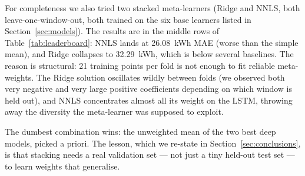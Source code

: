 For completeness we also tried two stacked meta-learners (Ridge and
NNLS, both leave-one-window-out, both trained on the six base learners
listed in Section~\ref{sec:models}). The results are in the middle
rows of Table~\ref{tab:leaderboard}: NNLS lands at 26.08~kWh MAE
(worse than the simple mean), and Ridge collapses to 32.29~kWh, which
is below several baselines. The reason is structural: 21 training
points per fold is not enough to fit reliable meta-weights. The Ridge
solution oscillates wildly between folds (we observed both very
negative and very large positive coefficients depending on which
window is held out), and NNLS concentrates almost all its weight on
the LSTM, throwing away the diversity the meta-learner was supposed
to exploit.

The dumbest combination wins: the unweighted mean of the two best
deep models, picked a priori. The lesson, which we re-state in
Section~\ref{sec:conclusions}, is that stacking needs a real
validation set --- not just a tiny held-out test set --- to learn
weights that generalise.
